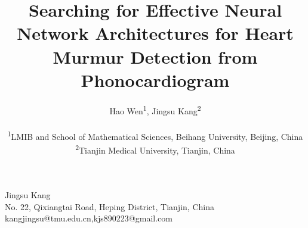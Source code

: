 \documentclass[twocolumn]{cinc}
\title{Searching for Effective Neural Network Architectures for Heart Murmur Detection from Phonocardiogram}
\author{Hao Wen\textsuperscript{1},
Jingsu Kang\textsuperscript{2} \\ \ \\
\textsuperscript{1}LMIB and School of Mathematical Sciences, Beihang University, Beijing, China\\
\textsuperscript{2}Tianjin Medical University, Tianjin, China
}
\begin{document}
\maketitle






















\begin{correspondence}
Jingsu Kang\\
No. 22, Qixiangtai Road, Heping District, Tianjin, China\\
kangjingsu@tmu.edu.cn,kjs890223@gmail.com
\end{correspondence}

\balance
\end{document}
